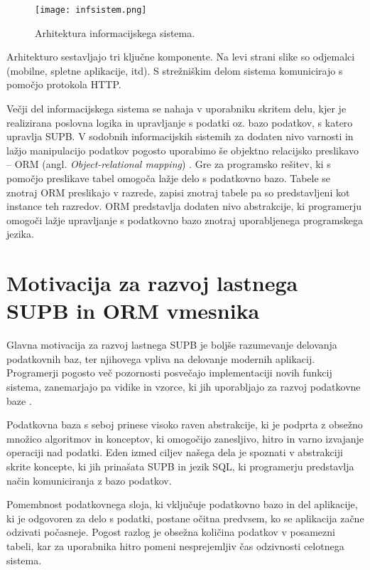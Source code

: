 \documentclass[a4paper,12pt,openright]{book}
\begin{document}
    \begin{figure}[h]
        \centerline{\texttt{[image: infsistem.png]}}
        \caption{Arhitektura informacijskega sistema.}
        \label{infsistem}
    \end{figure}

    \noindent
    Arhitekturo sestavljajo tri ključne komponente. Na levi strani slike so odjemalci (mobilne, spletne aplikacije, itd). S strežniškim delom sistema komunicirajo s pomočjo protokola HTTP.

    Večji del informacijskega sistema se nahaja v uporabniku skritem delu, kjer je realizirana poslovna logika in upravljanje s podatki oz. bazo podatkov, s katero upravlja SUPB. V sodobnih informacijskih sistemih za dodaten nivo varnosti in lažjo manipulacijo podatkov pogosto uporabimo še objektno relacijsko preslikavo – ORM (angl. \textit{Object-relational mapping}) \cite{torres-17}. Gre za programsko rešitev, ki s pomočjo preslikave tabel omogoča lažje delo s podatkovno bazo. Tabele se znotraj ORM preslikajo v razrede, zapisi znotraj tabele pa so predstavljeni kot instance teh razredov. ORM predstavlja dodaten nivo abstrakcije, ki programerju omogoči lažje upravljanje s podatkovno bazo znotraj uporabljenega programskega jezika.

    \section{Motivacija za razvoj lastnega SUPB in ORM vmesnika}
    Glavna motivacija za razvoj lastnega SUPB je boljše razumevanje delovanja podatkovnih baz, ter njihovega vpliva na delovanje modernih aplikacij. Programerji pogosto več pozornosti posvečajo implementaciji novih funkcij sistema, zanemarjajo pa vidike in vzorce, ki jih uporabljajo za razvoj podatkovne baze \cite{karwin2010sql}.
    
    Podatkovna baza s seboj prinese visoko raven abstrakcije, ki je podprta z obsežno množico algoritmov in konceptov, ki omogočijo zanesljivo, hitro in varno izvajanje operaciji nad podatki. Eden izmed ciljev našega dela je spoznati v abstrakciji skrite koncepte, ki jih prinašata SUPB in jezik SQL, ki programerju predstavlja način komuniciranja z bazo podatkov.

    Pomembnost podatkovnega sloja, ki vključuje podatkovno bazo in del aplikacije, ki je odgovoren za delo s podatki, postane očitna predvsem, ko se aplikacija začne odzivati počasneje. Pogost razlog je obsežna količina podatkov v posamezni tabeli, kar za uporabnika hitro pomeni nesprejemljiv čas odzivnosti celotnega sistema.
\end{document}
